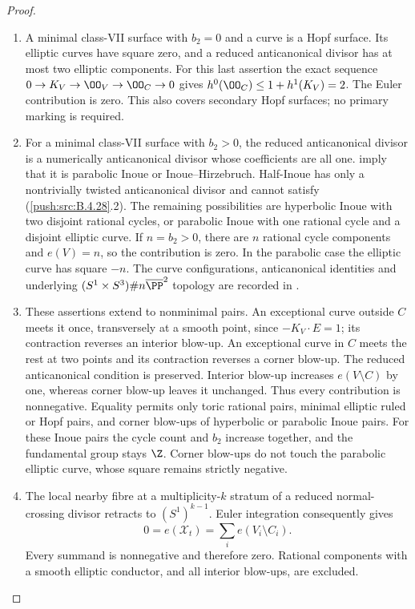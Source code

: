 \begin{proof}
\begin{enumerate}[label=\arabic*.,leftmargin=*]
\item A minimal class-VII surface with $b_2=0$ and a curve is
a Hopf surface. Its elliptic curves have square zero,
and a reduced anticanonical divisor has at most two
elliptic components. For this last assertion the exact
sequence $0\to K_V\to\OO_V\to\OO_C\to0$ gives
$h^0(\OO_C)\le1+h^1(K_V)=2$.
The Euler contribution is zero. This also covers
secondary Hopf surfaces; no primary marking is required.

\item For a minimal class-VII surface with $b_2>0$, the
reduced anticanonical divisor is a numerically
anticanonical divisor whose coefficients are all one.
\citet[Corollary 2.25, Lemma 2.26 and Proposition
2.27]{Dloussky2005AB} imply that it is parabolic Inoue
or Inoue--Hirzebruch. Half-Inoue has only a nontrivially
twisted anticanonical divisor and cannot satisfy
(\ref{push:src:B.4.28}.2). The remaining possibilities are hyperbolic
Inoue with two disjoint rational cycles, or parabolic
Inoue with one rational cycle and a disjoint elliptic
curve. If $n=b_2>0$, there are $n$ rational cycle
components and $e(V)=n$, so the contribution is zero.
In the parabolic case the elliptic curve has square
$-n$. The curve configurations, anticanonical identities
and underlying $(S^1\times S^3)\#n\overline{\PP}^2$
topology are recorded in
\citet[Sections 3.2--3.3]{FujikiPontecorvo2010AB}.

\item These assertions extend to nonminimal pairs. An
exceptional curve outside $C$ meets it once, transversely
at a smooth point, since $-K_V\cdot E=1$; its contraction
reverses an interior blow-up. An exceptional curve in
$C$ meets the rest at two points and its contraction
reverses a corner blow-up. The reduced anticanonical
condition is preserved. Interior blow-up increases
$e(V\setminus C)$ by one, whereas corner blow-up leaves
it unchanged. Thus every contribution is nonnegative.
Equality permits only toric rational pairs, minimal
elliptic ruled or Hopf pairs, and corner blow-ups of
hyperbolic or parabolic Inoue pairs. For these Inoue
pairs the cycle count and $b_2$ increase together, and
the fundamental group stays $\Z$. Corner blow-ups do
not touch the parabolic elliptic curve, whose square
remains strictly negative.

\item The local nearby fibre at a multiplicity-$k$ stratum
of a reduced normal-crossing divisor retracts to
$(S^1)^{k-1}$. Euler integration consequently gives
\[
 0=e(\mathcal X_t)=\sum_i e(V_i\setminus C_i).          \tag{B.4.28.4}
\]
Every summand is nonnegative and therefore zero.
Rational components with a smooth elliptic conductor,
and all interior blow-ups, are excluded.


\end{enumerate}
\end{proof}
